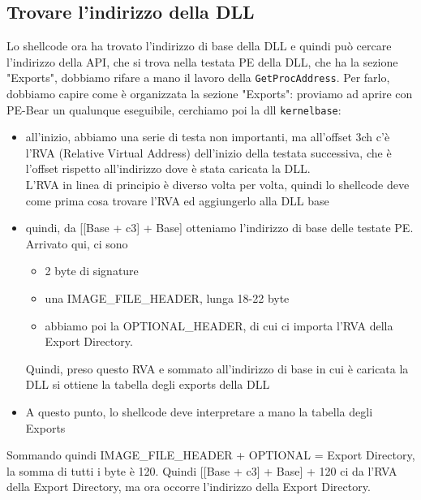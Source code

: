 \documentclass[12pt, oneside]{extbook}
\begin{document}
\subsection{Trovare l'indirizzo della DLL}
Lo shellcode ora ha trovato l'indirizzo di base della DLL e quindi può cercare l'indirizzo della API, che si trova nella testata PE della DLL, che ha la sezione "Exports", dobbiamo rifare a mano il lavoro della \texttt{GetProcAddress}. Per farlo, dobbiamo capire come è organizzata la sezione "Exports": proviamo ad aprire con PE-Bear un qualunque eseguibile, cerchiamo poi la dll \texttt{kernelbase}:
\begin{itemize}
	\item all'inizio, abbiamo una serie di testa non importanti, ma all'offset 3ch c'è l'RVA (Relative Virtual Address) dell'inizio della testata successiva, che è l'offset rispetto all'indirizzo dove è stata caricata la DLL.\\L'RVA in linea di principio è diverso volta per volta, quindi lo shellcode deve come prima cosa trovare l'RVA ed aggiungerlo alla DLL base
	\item quindi, da [[Base + c3] + Base] otteniamo l'indirizzo di base delle testate PE.\\Arrivato qui, ci sono
	\begin{itemize}
		\item 2 byte di signature
		\item una IMAGE\_FILE\_HEADER, lunga 18-22 byte
		\item abbiamo poi la OPTIONAL\_HEADER, di cui ci importa l'RVA della Export Directory.
	\end{itemize}
	Quindi, preso questo RVA e sommato all'indirizzo di base in cui è caricata la DLL si ottiene la tabella degli exports della DLL
	\item A questo punto, lo shellcode deve interpretare a mano la tabella degli Exports
\end{itemize}
Sommando quindi IMAGE\_FILE\_HEADER + OPTIONAL = Export Directory, la somma di tutti i byte è 120. Quindi [[Base + c3] + Base] + 120 ci da l'RVA della Export Directory, ma ora occorre l'indirizzo della Export Directory.
\end{document}
